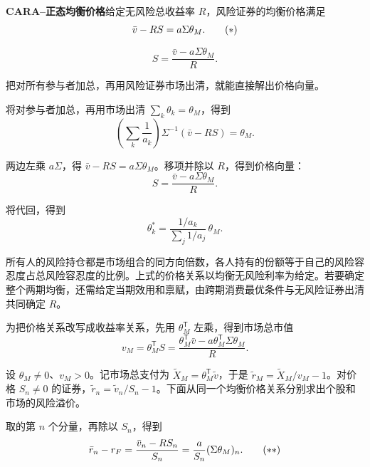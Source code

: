 \begin{tcolorbox}[knowledge]
\textbf{CARA--正态均衡价格}\quad 给定无风险总收益率 $R$，风险证券的均衡价格满足
\begin{equation*}
 \bar v-RS=a\Sigma\theta_M.
 \tag{\ensuremath{*}}\label{eq:wj-13-normal-price}
\end{equation*}

\begin{equation*}
 S=\frac{\bar v-a\Sigma\theta_M}{R}.
 \tag{13.V}\label{eq:wj-13-normal-equilibrium-price}
\end{equation*}
\end{tcolorbox}

把对所有参与者加总，再用风险证券市场出清，就能直接解出价格向量。

\begin{solution}[label-content={证明},blank-type=none]
将对参与者加总，再用市场出清 $\sum_k\theta_k=\theta_M$，得到
\[
 \left(\sum_k\frac1{a_k}\right)\Sigma^{-1}(\bar v-RS)=\theta_M.
\]

两边左乘 $a\Sigma$，得 $\bar v-RS=a\Sigma\theta_M$。移项并除以 $R$，得到价格向量：
\[
 \boxed{S=\frac{\bar v-a\Sigma\theta_M}{R}}.
\]
\end{solution}

将代回，得到
\[
 \theta_k^*=\frac{1/a_k}{\sum_j1/a_j}\,\theta_M.
\]

所有人的风险持仓都是市场组合的同方向倍数，各人持有的份额等于自己的风险容忍度占总风险容忍度的比例。上式的价格关系以均衡无风险利率为给定。若要确定整个两期均衡，还需给定当期效用和禀赋，由跨期消费最优条件与无风险证券出清共同确定 $R$。

为把价格关系改写成收益率关系，先用 $\theta_M^{\mathsf T}$ 左乘，得到市场总市值
\[
 v_M=\theta_M^{\mathsf T}S
 =\frac{\theta_M^{\mathsf T}\bar v-a\theta_M^{\mathsf T}\Sigma\theta_M}{R}.
\]

设 $\theta_M\ne0$、$v_M>0$。记市场总支付为 $\widetilde X_M=\theta_M^{\mathsf T}\widetilde v$，于是 $\widetilde r_M=\widetilde X_M/v_M-1$。对价格 $S_n\ne0$ 的证券，$\widetilde r_n=\widetilde v_n/S_n-1$。下面从同一个均衡价格关系分别求出个股和市场的风险溢价。

取的第 $n$ 个分量，再除以 $S_n$，得到
\begin{equation*}
 \bar r_n-r_F=\frac{\bar v_n-RS_n}{S_n}
 =\frac{a}{S_n}(\Sigma\theta_M)_n.
 \tag{\ensuremath{**}}\label{eq:wj-13-normal-premium}
\end{equation*}

